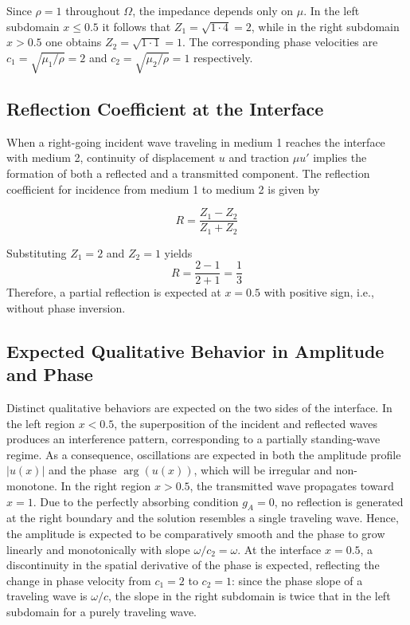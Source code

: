 Since \(\rho = 1\) throughout \(\Omega\), the impedance depends only on \(\mu\). In the left subdomain \(x \leq 0.5\) it follows that \(Z_1 = \sqrt{1 \cdot 4} = 2\), while in the right subdomain \(x > 0.5\) one obtains \(Z_2 = \sqrt{1 \cdot 1} = 1\). The corresponding phase velocities are \(c_1 = \sqrt{\mu_1/\rho} = 2\) and \(c_2 = \sqrt{\mu_2/\rho} = 1\) respectively.

\subsection{Reflection Coefficient at the Interface}

When a right-going incident wave traveling in medium 1 reaches the interface with medium 2, continuity of displacement \(u\) and traction \(\mu u'\) implies the formation of both a reflected and a transmitted component. The reflection coefficient for incidence from medium 1 to medium 2 is given by

\begin{equation}
    R = \frac{Z_1 - Z_2}{Z_1 + Z_2}
    \label{eq:reflection_coeff}
\end{equation}

Substituting \(Z_1 = 2\) and \(Z_2 = 1\) yields
\[
R = \frac{2 - 1}{2 + 1} = \frac{1}{3}
\]
Therefore, a partial reflection is expected at \(x = 0.5\) with positive sign, i.e., without phase inversion.

\subsection{Expected Qualitative Behavior in Amplitude and Phase}

Distinct qualitative behaviors are expected on the two sides of the interface. In the left region \(x < 0.5\), the superposition of the incident and reflected waves produces an interference pattern, corresponding to a partially standing-wave regime. As a consequence, oscillations are expected in both the amplitude profile \(|u(x)|\) and the phase \(\arg(u(x))\), which will be irregular and non-monotone. In the right region \(x > 0.5\), the transmitted wave propagates toward \(x = 1\). Due to the perfectly absorbing condition \(g_A = 0\), no reflection is generated at the right boundary and the solution resembles a single traveling wave. Hence, the amplitude is expected to be comparatively smooth and the phase to grow linearly and monotonically with slope \(\omega/c_2 = \omega\). At the interface \(x = 0.5\), a discontinuity in the spatial derivative of the phase is expected, reflecting the change in phase velocity from \(c_1 = 2\) to \(c_2 = 1\): since the phase slope of a traveling wave is \(\omega/c\), the slope in the right subdomain is twice that in the left subdomain for a purely traveling wave.

